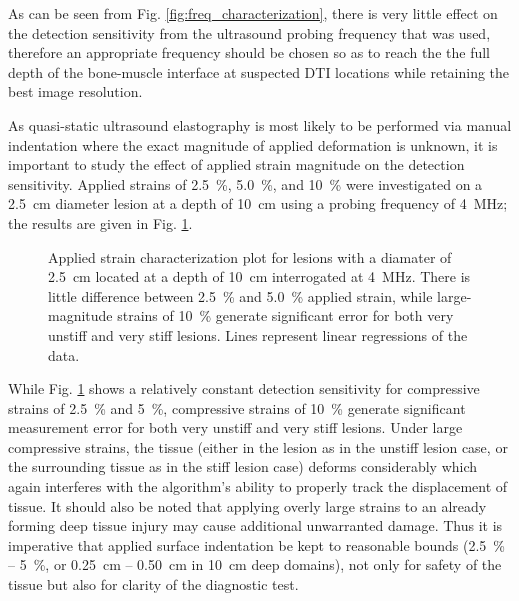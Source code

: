 			As can be seen from Fig. \ref{fig:freq_characterization}, there is very little effect on the detection sensitivity from the ultrasound probing frequency that was used, therefore an appropriate frequency should be chosen so as to reach the the full depth of the bone-muscle interface at suspected DTI locations while retaining the best image resolution.

			As quasi-static ultrasound elastography is most likely to be performed via manual indentation where the exact magnitude of applied deformation is unknown, it is important to study the effect of applied strain magnitude on the detection sensitivity. Applied strains of \SI{2.5}{\percent}, \SI{5.0}{\percent}, and \SI{10}{\percent} were investigated on a \SI{2.5}{\cm} diameter lesion at a depth of \SI{10}{\cm} using a probing frequency of \SI{4}{\MHz}; the results are given in Fig. \ref{fig:strain_characterization}.

			\begin{figure}[!htb]
				\centering
				\caption[Quasi-static applied strain characterization]{Applied strain characterization plot for lesions with a diamater of \SI{2.5}{\cm} located at a depth of \SI{10}{\cm} interrogated at \SI{4}{\MHz}. There is little difference between \SI{2.5}{\percent} and \SI{5.0}{\percent} applied strain, while large-magnitude strains of \SI{10}{\percent} generate significant error for both very unstiff and very stiff lesions. Lines represent linear regressions of the data.}
				\label{fig:strain_characterization}
			\end{figure}

			While Fig. \ref{fig:strain_characterization} shows a relatively constant detection sensitivity for compressive strains of \SI{2.5}{\percent} and \SI{5}{\percent}, compressive strains of \SI{10}{\percent} generate significant measurement error for both very unstiff and very stiff lesions. Under large compressive strains, the tissue (either in the lesion as in the unstiff lesion case, or the surrounding tissue as in the stiff lesion case) deforms considerably which again interferes with the algorithm's ability to properly track the displacement of tissue. It should also be noted that applying overly large strains to an already forming deep tissue injury may cause additional unwarranted damage. Thus it is imperative that applied surface indentation be kept to reasonable bounds (\SI{2.5}{\percent} -- \SI{5}{\percent}, or \SI{0.25}{\cm} -- \SI{0.50}{\cm} in \SI{10}{\cm} deep domains), not only for safety of the tissue but also for clarity of the diagnostic test.

